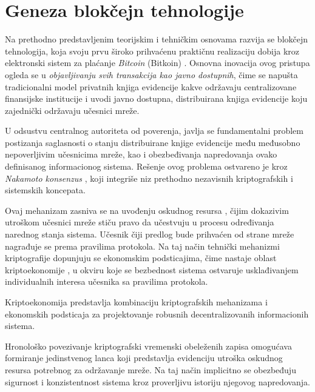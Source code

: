 \section{Geneza blokčejn tehnologije}
Na prethodno predstavljenim teorijskim i tehničkim osnovama razvija se blokčejn tehnologija, koja svoju prvu široko prihvaćenu praktičnu realizaciju dobija kroz elektronski sistem za plaćanje \textit{Bitcoin} (Bitkoin) \cite{nakamoto2008bitcoin, crosby2016blockchain}. Osnovna inovacija ovog pristupa ogleda se u \textit{objavljivanju svih transakcija kao javno dostupnih}, čime se napušta tradicionalni model privatnih knjiga evidencije  kakve održavaju centralizovane finansijske institucije i uvodi javno dostupna, distribuirana knjiga evidencije koju zajednički održavaju učesnici mreže.

U odsustvu centralnog autoriteta od poverenja, javlja se fundamentalni problem postizanja saglasnosti o stanju distribuirane knjige evidencije među međusobno nepoverljivim učesnicima mreže, kao i obezbeđivanja napredovanja ovako definisanog informacionog sistema. Rešenje ovog problema ostvareno je kroz \textit{Nakamoto konsenzus} \cite{stifter2018agreement}, koji integriše niz prethodno nezavisnih kriptografskih i sistemskih koncepata. 

Ovaj mehanizam zasniva se na uvođenju oskudnog resursa , čijim dokazivim utroškom učesnici mreže stiču pravo da učestvuju u procesu određivanja narednog stanja sistema. Učesnik čiji predlog bude prihvaćen od strane mreže nagrađuje se prema pravilima protokola. Na taj način tehnički mehanizmi kriptografije dopunjuju se ekonomskim podsticajima, čime nastaje oblast kriptoekonomije  \cite{brekke2021cryptoeconomics}, u okviru koje se bezbednost sistema ostvaruje usklađivanjem individualnih interesa učesnika sa pravilima protokola.

\begin{definicija}
Kriptoekonomija predstavlja kombinaciju kriptografskih mehanizama i ekonomskih podsticaja za projektovanje robusnih decentralizovanih informacionih sistema.
\end{definicija}

Hronološko povezivanje kriptografski vremenski obeleženih zapisa omogućava formiranje jedinstvenog lanca koji predstavlja evidenciju utroška oskudnog resursa potrebnog za održavanje mreže. Na taj način implicitno se obezbeđuju sigurnost i konzistentnost sistema kroz proverljivu istoriju njegovog napredovanja.

